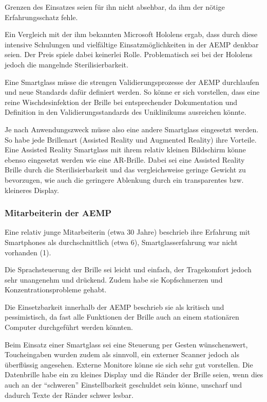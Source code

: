 Grenzen des Einsatzes seien für ihn nicht absehbar, da ihm der nötige Erfahrungsschatz fehle.

Ein Vergleich mit der ihm bekannten Microsoft Hololens ergab, dass durch diese intensive Schulungen und vielfältige Einsatzmöglichkeiten in der AEMP denkbar seien. Der Preis spiele dabei keinerlei Rolle. Problematisch sei bei der Hololens jedoch die mangelnde Sterilisierbarkeit.

Eine Smartglass müsse die strengen Validierungsprozesse der AEMP durchlaufen und neue Standards dafür definiert werden. So könne er sich vorstellen, dass eine reine Wischdesinfektion der Brille bei entsprechender Dokumentation und Definition in den Validierungsstandards des Uniklinikums ausreichen könnte.

Je nach Anwendungszweck müsse also eine andere Smartglass eingesetzt werden. So habe jede Brillenart (Assisted Reality und Augmented Reality) ihre Vorteile. Eine Assisted Reality Smartglass mit ihrem relativ kleinen Bildschirm könne ebenso eingesetzt werden wie eine AR-Brille. Dabei sei eine Assisted Reality Brille durch die Sterilisierbarkeit und das vergleichsweise geringe Gewicht zu bevorzugen, wie auch die geringere Ablenkung durch ein transparentes bzw. kleineres Display.
%
%
\subsubsection{Mitarbeiterin der AEMP}
%
Eine relativ junge Mitarbeiterin (etwa 30 Jahre) beschrieb ihre Erfahrung mit Smartphones als durchschnittlich (etwa 6), Smartglasserfahrung war nicht vorhanden (1).

Die Sprachsteuerung der Brille sei leicht und einfach, der Tragekomfort jedoch sehr unangenehm und drückend. Zudem habe sie Kopfschmerzen und Konzentrationsprobleme gehabt.

Die Einsetzbarkeit innerhalb der AEMP beschrieb sie als kritisch und pessimistisch, da fast alle Funktionen der Brille auch an einem stationären Computer durchgeführt werden könnten. 

Beim Einsatz einer Smartglass sei eine Steuerung per Gesten wünschenswert, Toucheingaben wurden zudem als sinnvoll, ein externer Scanner jedoch als überflüssig angesehen. Externe Monitore könne sie sich sehr gut vorstellen. Die Datenbrille habe ein zu kleines Display und die Ränder der Brille seien, wenn dies auch an der \enquote{schweren} Einstellbarkeit geschuldet sein könne, unscharf und dadurch Texte der Ränder schwer lesbar.

